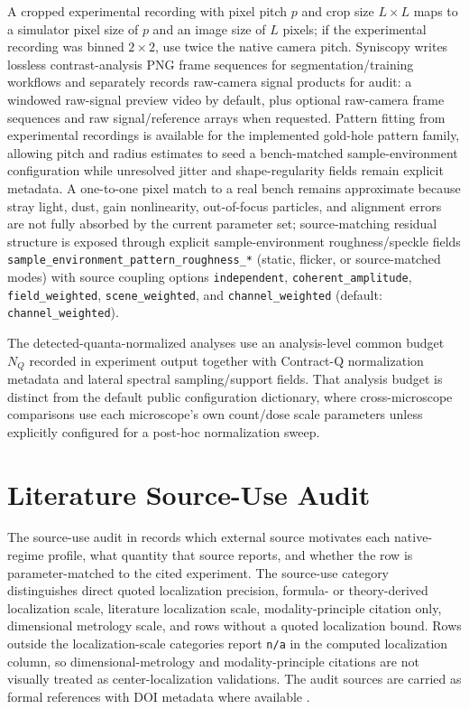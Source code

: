 A cropped experimental recording with pixel pitch $p$ and crop size $L\times L$ maps to a simulator pixel size of $p$ and an image size of $L$ pixels; if the experimental recording was binned $2\times2$, use twice the native camera pitch. Syniscopy writes lossless contrast-analysis PNG frame sequences for segmentation/training workflows and separately records raw-camera signal products for audit: a windowed raw-signal preview video by default, plus optional raw-camera frame sequences and raw signal/reference arrays when requested. Pattern fitting from experimental recordings is available for the implemented gold-hole pattern family, allowing pitch and radius estimates to seed a bench-matched sample-environment configuration while unresolved jitter and shape-regularity fields remain explicit metadata. A one-to-one pixel match to a real bench remains approximate because stray light, dust, gain nonlinearity, out-of-focus particles, and alignment errors are not fully absorbed by the current parameter set; source-matching residual structure is exposed through explicit sample-environment roughness/speckle fields \texttt{sample\_environment\_pattern\_roughness\_*} (static, flicker, or source-matched modes) with source coupling options \texttt{independent}, \texttt{coherent\_amplitude}, \texttt{field\_weighted}, \texttt{scene\_weighted}, and \texttt{channel\_weighted} (default: \texttt{channel\_weighted}).

The detected-quanta-normalized analyses use an analysis-level common budget $N_Q$ recorded in experiment output together with Contract-Q normalization metadata and lateral spectral sampling/support fields. That analysis budget is distinct from the default public configuration dictionary, where cross-microscope comparisons use each microscope's own count/dose scale parameters unless explicitly configured for a post-hoc normalization sweep.

\section{Literature Source-Use Audit}
\label{sec:source-use-audit}

The source-use audit in  records which external source motivates each native-regime profile, what quantity that source reports, and whether the row is parameter-matched to the cited experiment. The source-use category distinguishes direct quoted localization precision, formula- or theory-derived localization scale, literature localization scale, modality-principle citation only, dimensional metrology scale, and rows without a quoted localization bound. Rows outside the localization-scale categories report \texttt{n/a} in the computed localization column, so dimensional-metrology and modality-principle citations are not visually treated as center-localization validations. The audit sources are carried as formal references with DOI metadata where available \cite{kovari-brightfield-3d,huang-cobri-virus,ando-darkfield-angstrom,juffmann-iscat-cobri-crlb,kurata-zernike-phase-retrieval,tian-waller-dpc,bon-qpi-nanoparticles,verpillat-dhm-gold,clack-groves-ricm,thompson-larson-webb,axelrod-tirf,rice-tem-sizing,crouzier-sem-diameter}.

